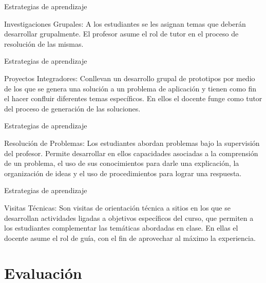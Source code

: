\documentclass[handout,xcolor=dvipsnames]{beamer}
\newcommand{\pageframe}[1]{\frame{\begin{center}{ \Huge #1 }\end{center}}}
\begin{document}
\begin{frame}{Estrategias de aprendizaje}
  \begin{block}{Investigaciones Grupales:}
     A los estudiantes se les asignan temas que deberán desarrollar grupalmente. El profesor asume el rol de tutor en el proceso de resolución de las mismas.
  \end{block}
\end{frame}


\begin{frame}{Estrategias de aprendizaje}
  \begin{block}{Proyectos Integradores:} 
    Conllevan un desarrollo grupal de prototipos por medio de los que se genera una solución a un problema de aplicación y tienen como fin el hacer confluir diferentes temas específicos. En ellos el docente funge como tutor del proceso de generación de las soluciones.  
  \end{block}
\end{frame}

\begin{frame}{Estrategias de aprendizaje}
  \begin{block}{Resolución de Problemas:} 
    Los estudiantes abordan problemas bajo la supervisión del profesor. Permite desarrollar en ellos capacidades asociadas a la comprensión de un problema, el uso de sus conocimientos para darle una explicación, la organización de ideas y el uso de procedimientos para lograr una respuesta.
  \end{block}
\end{frame}

\begin{frame}{Estrategias de aprendizaje}
  \begin{block}{Visitas Técnicas:} 
    Son visitas de orientación técnica a sitios en los que se desarrollan actividades ligadas a objetivos específicos del curso, que permiten a los estudiantes complementar las temáticas abordadas en clase. En ellas el docente asume el rol de guía, con el fin de aprovechar al máximo la experiencia.

  \end{block}
\end{frame}


  
\section{Evaluaci\'on}

\pageframe{Evaluación}
\end{document}
